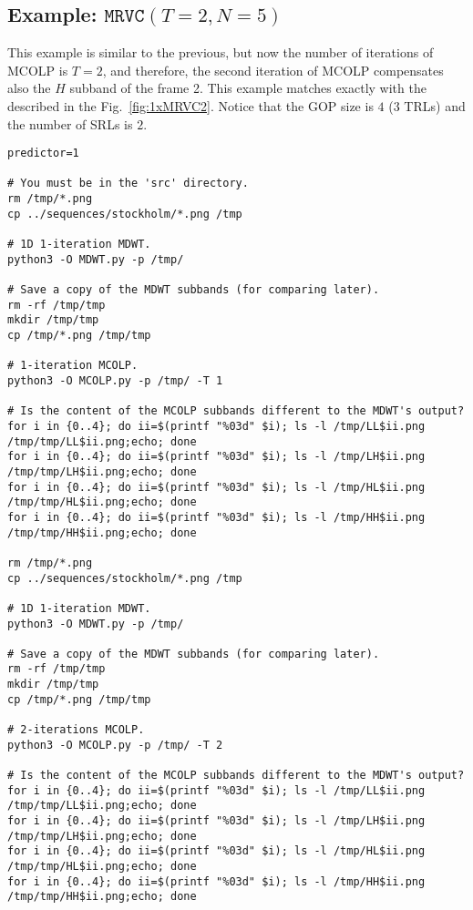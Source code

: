 
\subsection{Example: $\mathtt{MRVC}(T=2, N=5)$}

This example is similar to the previous, but now the number of
iterations of MCOLP is $T=2$, and therefore, the second iteration of
MCOLP compensates also the $H$ subband of the frame 2. This example
matches exactly with the described in the
Fig.~\ref{fig:1xMRVC2}. Notice that the GOP size is $4$ ($3$ TRLs) and
the number of SRLs is $2$.

\begin{verbatim}
predictor=1

# You must be in the 'src' directory.
rm /tmp/*.png
cp ../sequences/stockholm/*.png /tmp

# 1D 1-iteration MDWT.
python3 -O MDWT.py -p /tmp/

# Save a copy of the MDWT subbands (for comparing later).
rm -rf /tmp/tmp
mkdir /tmp/tmp
cp /tmp/*.png /tmp/tmp

# 1-iteration MCOLP.
python3 -O MCOLP.py -p /tmp/ -T 1

# Is the content of the MCOLP subbands different to the MDWT's output?
for i in {0..4}; do ii=$(printf "%03d" $i); ls -l /tmp/LL$ii.png /tmp/tmp/LL$ii.png;echo; done
for i in {0..4}; do ii=$(printf "%03d" $i); ls -l /tmp/LH$ii.png /tmp/tmp/LH$ii.png;echo; done
for i in {0..4}; do ii=$(printf "%03d" $i); ls -l /tmp/HL$ii.png /tmp/tmp/HL$ii.png;echo; done
for i in {0..4}; do ii=$(printf "%03d" $i); ls -l /tmp/HH$ii.png /tmp/tmp/HH$ii.png;echo; done

rm /tmp/*.png
cp ../sequences/stockholm/*.png /tmp

# 1D 1-iteration MDWT.
python3 -O MDWT.py -p /tmp/

# Save a copy of the MDWT subbands (for comparing later).
rm -rf /tmp/tmp
mkdir /tmp/tmp
cp /tmp/*.png /tmp/tmp

# 2-iterations MCOLP.
python3 -O MCOLP.py -p /tmp/ -T 2

# Is the content of the MCOLP subbands different to the MDWT's output?
for i in {0..4}; do ii=$(printf "%03d" $i); ls -l /tmp/LL$ii.png /tmp/tmp/LL$ii.png;echo; done
for i in {0..4}; do ii=$(printf "%03d" $i); ls -l /tmp/LH$ii.png /tmp/tmp/LH$ii.png;echo; done
for i in {0..4}; do ii=$(printf "%03d" $i); ls -l /tmp/HL$ii.png /tmp/tmp/HL$ii.png;echo; done
for i in {0..4}; do ii=$(printf "%03d" $i); ls -l /tmp/HH$ii.png /tmp/tmp/HH$ii.png;echo; done


\end{verbatim}
